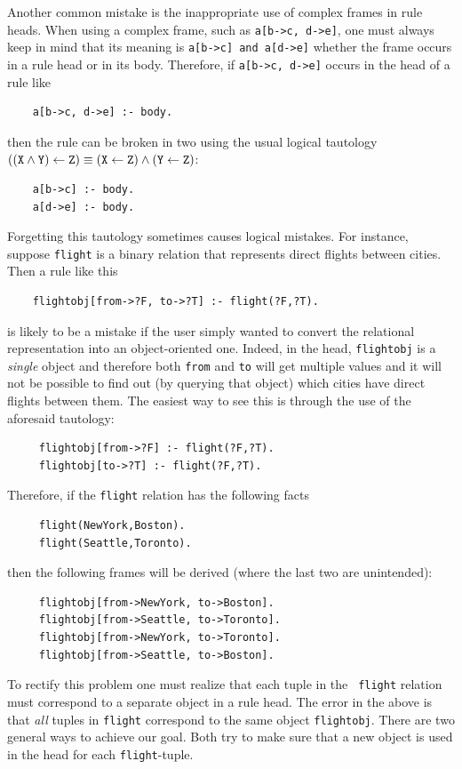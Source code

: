 \documentclass[11pt]{article}
\begin{document}
Another common mistake is the inappropriate use of complex frames in
rule heads. When using a complex frame, such as {\tt a[b->c, d->e]},
one must always keep in mind that  its meaning is {\tt a[b->c] and a[d->e]}
whether the frame occurs in a rule head or in its body. Therefore, if
{\tt a[b->c, d->e]} occurs in the head of a rule like
\begin{verbatim}
    a[b->c, d->e] :- body.  
\end{verbatim}
then the rule can be broken in two using the usual logical tautology 
$\tt ((X\wedge Y)\leftarrow Z) \equiv (X\leftarrow Z)\wedge(Y\leftarrow Z)$:
\begin{verbatim}
    a[b->c] :- body.
    a[d->e] :- body.
\end{verbatim}
Forgetting this tautology sometimes causes logical mistakes.
For instance, suppose {\tt flight} is a binary relation that represents
direct flights between cities. Then a rule like this
\begin{verbatim}
    flightobj[from->?F, to->?T] :- flight(?F,?T).  
\end{verbatim}
is likely to be a mistake if the user simply wanted to convert the
relational representation into an object-oriented one. Indeed, in the head,
{\tt flightobj} is a \emph{single} object and therefore both {\tt from} and
{\tt to} will get multiple values and it will not be possible to find out
(by querying that object) which cities have direct flights between them.
The easiest way to see this is through the use of the aforesaid tautology:
\begin{verbatim}
     flightobj[from->?F] :- flight(?F,?T).
     flightobj[to->?T] :- flight(?F,?T).
\end{verbatim}
Therefore, if the {\tt flight} relation has the following facts
\begin{verbatim}
     flight(NewYork,Boston).  
     flight(Seattle,Toronto).  
\end{verbatim}
then the following frames will be derived (where the last two are
unintended):
\begin{verbatim}
     flightobj[from->NewYork, to->Boston].  
     flightobj[from->Seattle, to->Toronto].  
     flightobj[from->NewYork, to->Toronto].  
     flightobj[from->Seattle, to->Boston].  
\end{verbatim}
To rectify this problem one must realize that each tuple in the {\tt
  flight} relation must correspond to a separate object in a rule head.
The error in the above is that \emph{all} tuples in {\tt flight}
correspond to the same object {\tt flightobj}.  There are two general ways
to achieve our goal. Both try to make sure that a new object is used in
the head for each {\tt flight}-tuple.
\end{document}
